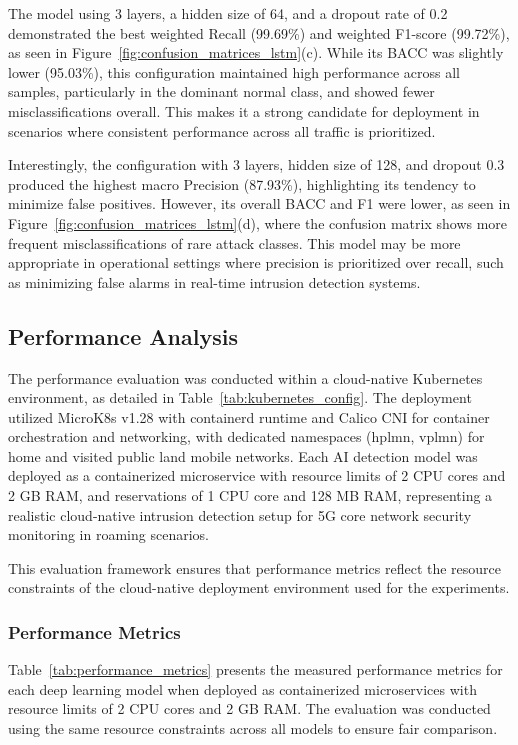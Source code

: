 \documentclass[journal,article,submit,moreauthors,pdftex]{Definitions/tsp}
\begin{document}
The model using 3 layers, a hidden size of 64, and a dropout rate of 0.2 demonstrated the best weighted Recall (99.69\%) and weighted F1-score (99.72\%), as seen in Figure~\ref{fig:confusion_matrices_lstm}(c). While its BACC was slightly lower (95.03\%), this configuration maintained high performance across all samples, particularly in the dominant normal class, and showed fewer misclassifications overall. This makes it a strong candidate for deployment in scenarios where consistent performance across all traffic is prioritized.

Interestingly, the configuration with 3 layers, hidden size of 128, and dropout 0.3 produced the highest macro Precision (87.93\%), highlighting its tendency to minimize false positives. However, its overall BACC and F1 were lower, as seen in Figure~\ref{fig:confusion_matrices_lstm}(d), where the confusion matrix shows more frequent misclassifications of rare attack classes. This model may be more appropriate in operational settings where precision is prioritized over recall, such as minimizing false alarms in real-time intrusion detection systems.


\subsection{Performance Analysis}

The performance evaluation was conducted within a cloud-native Kubernetes environment, as detailed in Table~\ref{tab:kubernetes_config}. The deployment utilized MicroK8s v1.28 with containerd runtime and Calico CNI for container orchestration and networking, with dedicated namespaces (hplmn, vplmn) for home and visited public land mobile networks. Each AI detection model was deployed as a containerized microservice with resource limits of 2 CPU cores and 2 GB RAM, and reservations of 1 CPU core and 128 MB RAM, representing a realistic cloud-native intrusion detection setup for 5G core network security monitoring in roaming scenarios.

This evaluation framework ensures that performance metrics reflect the resource constraints of the cloud-native deployment environment used for the experiments.


\subsubsection{Performance Metrics}

Table~\ref{tab:performance_metrics} presents the measured performance metrics for each deep learning model when deployed as containerized microservices with resource limits of 2 CPU cores and 2 GB RAM. The evaluation was conducted using the same resource constraints across all models to ensure fair comparison.
\end{document}
